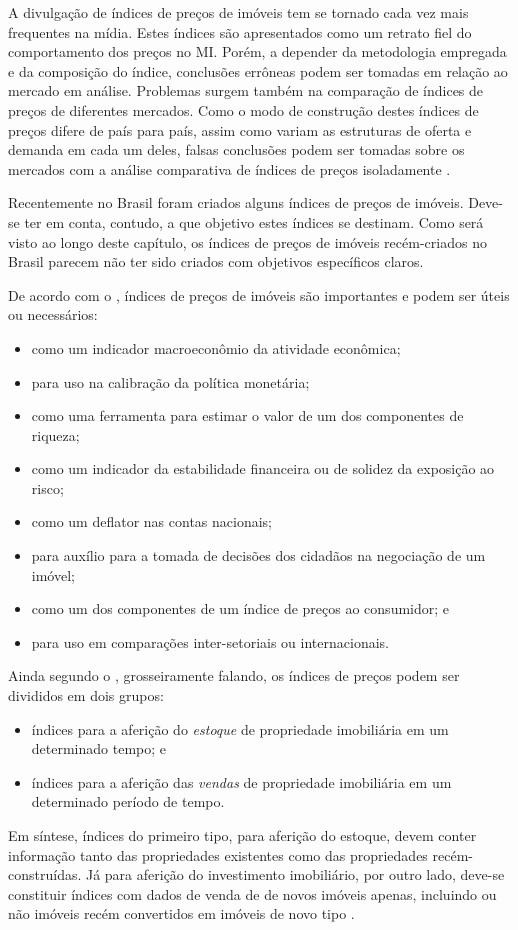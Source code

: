 \documentclass[
	12pt,				%
	oneside,			%
	a4paper,			%
	chapter=TITLE,		%
	section=TITLE,		%
	english,			%
	brazil				%
	]{abntex2}
\begin{document}
\begin{refsection}
A divulgação de índices de preços de imóveis tem se tornado cada vez mais
frequentes na mídia. Estes índices são apresentados como um retrato fiel do
comportamento dos preços no \gls{MI}. Porém, a depender da metodologia empregada
e da composição do índice, conclusões errôneas podem ser tomadas em relação ao
mercado em análise. Problemas surgem também na comparação de índices de preços
de diferentes mercados. Como o modo de construção destes índices de preços
difere de país para país, assim como variam as estruturas de oferta e demanda em
cada um deles, falsas conclusões podem ser tomadas sobre os mercados com a
análise comparativa de índices de preços isoladamente \autocite[3-4]{regulation}.

Recentemente no Brasil foram criados alguns índices de preços de imóveis.
Deve-se ter em conta, contudo, a que objetivo estes índices se destinam. Como
será visto ao longo deste capítulo, os índices de preços de imóveis
recém-criados no Brasil parecem não ter sido criados com objetivos específicos
claros.

De acordo com o \textcite{rppi}, índices de preços de imóveis são importantes e podem ser
úteis ou necessários:
\begin{itemize}
\tightlist
\item
  como um indicador macroeconômio da atividade econômica;
\item
  para uso na calibração da política monetária;
\item
  como uma ferramenta para estimar o valor de um dos componentes de riqueza;
\item
  como um indicador da estabilidade financeira ou de solidez da exposição ao
  risco;
\item
  como um deflator nas contas nacionais;
\item
  para auxílio para a tomada de decisões dos cidadãos na negociação de um imóvel;
\item
  como um dos componentes de um índice de preços ao consumidor; e
\item
  para uso em comparações inter-setoriais ou internacionais.
\end{itemize}
Ainda segundo o \textcite{rppi}, grosseiramente falando, os índices de preços podem ser
divididos em dois grupos:
\begin{itemize}
\tightlist
\item
  índices para a aferição do \emph{estoque} de propriedade imobiliária em um
  determinado tempo; e
\item
  índices para a aferição das \emph{vendas} de propriedade imobiliária em um
  determinado período de tempo.
\end{itemize}
Em síntese, índices do primeiro tipo, para aferição do estoque, devem conter
informação tanto das propriedades existentes como das propriedades
recém-construídas. Já para aferição do investimento imobiliário, por outro lado,
deve-se constituir índices com dados de venda de de novos imóveis apenas,
incluindo ou não imóveis recém convertidos em imóveis de novo tipo \autocite[155]{rppi}.


\end{refsection}
\end{document}
